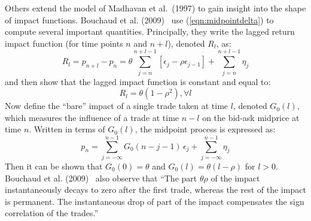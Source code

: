 Others extend the model of Madhavan et al.~(1997) to gain insight into the shape of impact functions.  Bouchaud et al. (2009)~\cite{bouchaud2009} use (\ref{eqn:midpointdelta}) to compute several important quantities. Principally, they write the lagged return impact function (for time points $n$ and $n+l$), denoted $R_l$, as:
	\begin{equation}\label{eqn:rlittlel}
	R_l = p_{n+l}-p_n = \theta \sum_{j=n}^{n+l-1}[\epsilon_j - \rho \epsilon_{j-1}]+ \sum_{j=n}^{n+l-1}\eta_j
	\end{equation}
and then show that the lagged impact function is constant and equal to:
	\begin{equation}\label{eqn:rlittlel2}
	R_l = \theta (1-\rho^2), \forall l
	\end{equation}
Now define the ``bare'' impact of a single trade taken at time $l$, denoted $G_0(l)$, which measures the influence of a trade at time $n-l$ on the bid-ask midprice at time $n$. Written in terms of $G_0(l)$, the midpoint process is expressed as:
	\begin{equation}\label{eqn:plittlen}
	p_n = \sum_{j=-\infty}^{n-1}G_0(n-j-1)\,\epsilon_j + \sum_{j=-\infty}^{n-1}\eta_j
	\end{equation}
Then it can be shown that $G_0(0) = \theta$ and $G_0(l) = \theta(l-\rho)$ for $l>0$. Bouchaud et al. (2009)~\cite{bouchaud2009} also observe that ``The part $\theta \rho$ of the impact instantaneously decays to zero after the first trade, whereas the rest of the impact is permanent. The instantaneous drop of part of the impact compensates the sign correlation of the trades.''


